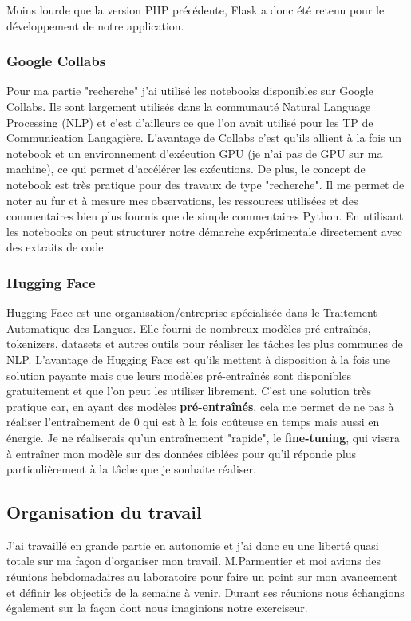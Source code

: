 \documentclass[12pt]{article}
\begin{document}
Moins lourde que la version PHP précédente, Flask a donc été retenu pour le développement de notre application.

\subsubsection{Google Collabs}
Pour ma partie "recherche" j'ai utilisé les notebooks disponibles sur Google Collabs. Ils sont largement utilisés dans la communauté Natural Language Processing (NLP) et c'est d'ailleurs ce que l'on avait utilisé pour les TP de Communication Langagière. L'avantage de Collabs c'est qu'ils allient à la fois un notebook et un environnement d'exécution GPU (je n'ai pas de GPU sur ma machine), ce qui permet d'accélérer les exécutions. 
De plus, le concept de notebook est très pratique pour des travaux de type "recherche". Il me permet de noter au fur et à mesure mes observations, les ressources utilisées et des commentaires bien plus fournis que de simple commentaires Python. En utilisant les notebooks on peut structurer notre démarche expérimentale directement avec des extraits de code. 

\subsubsection{Hugging Face}
Hugging Face est une organisation/entreprise spécialisée dans le Traitement Automatique des Langues. Elle fourni de nombreux modèles pré-entraînés, tokenizers, datasets et autres outils pour réaliser les tâches les plus communes de NLP. L'avantage de Hugging Face est qu'ils mettent à disposition à la fois une solution payante mais que leurs modèles pré-entraînés sont disponibles gratuitement et que l'on peut les utiliser librement. C'est une solution très pratique car, en ayant des modèles \textbf{pré-entraînés}, cela me permet de ne pas à réaliser l'entraînement de 0 qui est à la fois coûteuse en temps mais aussi en énergie. Je ne réaliserais qu'un entraînement "rapide", le \textbf{fine-tuning}, qui visera à entraîner mon modèle sur des données ciblées pour qu'il réponde plus particulièrement à la tâche que je souhaite réaliser. 

\subsection{Organisation du travail}

J’ai travaillé en grande partie en autonomie et j’ai donc eu une liberté quasi totale sur ma façon d’organiser mon travail. M.Parmentier et moi avions des réunions hebdomadaires au laboratoire pour faire un point sur mon avancement et définir les objectifs de la semaine à venir. Durant ses réunions nous échangions également sur la façon dont nous imaginions notre exerciseur. 
\end{document}
